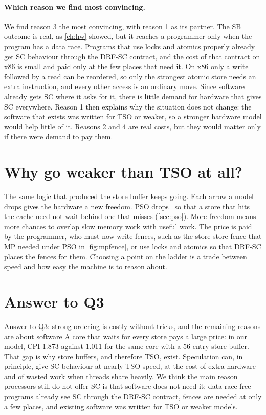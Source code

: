 \paragraph{Which reason we find most convincing.} We find reason 3 the most convincing, with reason 1 as its partner. The SB outcome is real, as \cref{ch:hw} showed, but it reaches a programmer only when the program has a data race. Programs that use locks and atomics properly already get SC behaviour through the DRF-SC contract, and the cost of that contract on x86 is small and paid only at the few places that need it. On x86 only a write followed by a read can be reordered, so only the strongest atomic store needs an extra instruction, and every other access is an ordinary move. Since software already gets SC where it asks for it, there is little demand for hardware that gives SC everywhere. Reason 1 then explains why the situation does not change: the software that exists was written for TSO or weaker, so a stronger hardware model would help little of it. Reasons 2 and 4 are real costs, but they would matter only if there were demand to pay them.

\section{Why go weaker than TSO at all?}
\label{sec:weaker}

The same logic that produced the store buffer keeps going. Each arrow a model drops gives the hardware a new freedom. PSO drops \WW\ so that a store that hits the cache need not wait behind one that misses (\cref{sec:pso}). More freedom means more chances to overlap slow memory work with useful work. The price is paid by the programmer, who must now write fences, such as the store-store fence that MP needed under PSO in \cref{fig:mpfence}, or use locks and atomics so that DRF-SC places the fences for them. Choosing a point on the ladder is a trade between speed and how easy the machine is to reason about.

\section{Answer to Q3}
\label{sec:q3}

\begin{resultbox}{Answer to Q3: strong ordering is costly without tricks, and the remaining reasons are about software}
A core that waits for every store pays a large price: in our model, CPI 1.873 against 1.011 for the same core with a 56-entry store buffer. That gap is why store buffers, and therefore TSO, exist. Speculation can, in principle, give SC behaviour at nearly TSO speed, at the cost of extra hardware and of wasted work when threads share heavily. We think the main reason processors still do not offer SC is that software does not need it: data-race-free programs already see SC through the DRF-SC contract, fences are needed at only a few places, and existing software was written for TSO or weaker models.
\end{resultbox}

